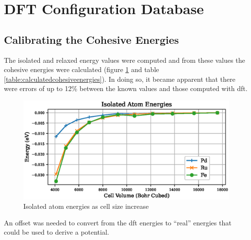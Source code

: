 



\FloatBarrier
\section{DFT Configuration Database}
\label{section:dftconfigurationdbresults}


\subsection{Calibrating the Cohesive Energies}

The isolated and relaxed energy values were computed and from these values the cohesive energies were calculated (figure \ref{fig:isolatedatoms} and table \ref{table:calculatedcohesiveenergies}).  In doing so, it became apparent that there were errors of up to 12\% between the known values and those computed with \acrshort{dft}.

\begin{figure}[h]
\begin{center}
\includegraphics[width=0.5\linewidth]{chapters/potentials_fe_pd_ru/isolated/isolated_63.eps}
\caption{Isolated atom energies as cell size increase}
\label{fig:isolatedatoms}
\end{center}
\end{figure}

An offset was needed to convert from the \acrshort{dft} energies to \enquote{real} energies that could be used to derive a potential.

